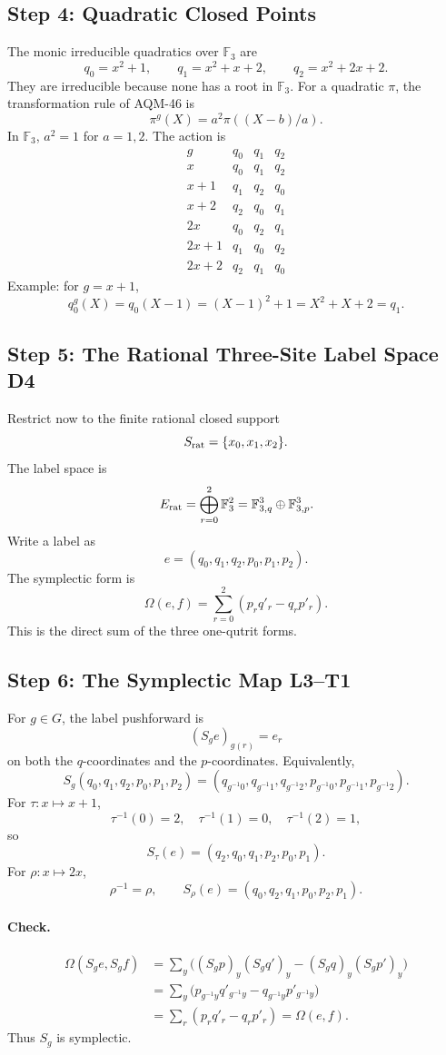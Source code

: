 \subsection{Step 4: Quadratic Closed Points}
The monic irreducible quadratics over \(\mathbb F_3\) are
\[
  q_0=x^2+1,\qquad q_1=x^2+x+2,\qquad q_2=x^2+2x+2.
\]
They are irreducible because none has a root in \(\mathbb F_3\).  For a
quadratic \(\pi\), the transformation rule of AQM-46 is
\[
  \pi^g(X)=a^2\pi((X-b)/a).
\]
In \(\mathbb F_3\), \(a^2=1\) for \(a=1,2\).  The action is
\[
\begin{array}{c|ccc}
g&q_0&q_1&q_2\\
\hline
x&q_0&q_1&q_2\\
x+1&q_1&q_2&q_0\\
x+2&q_2&q_0&q_1\\
2x&q_0&q_2&q_1\\
2x+1&q_1&q_0&q_2\\
2x+2&q_2&q_1&q_0
\end{array}
\]
Example: for \(g=x+1\),
\[
  q_0^g(X)=q_0(X-1)=(X-1)^2+1=X^2+X+2=q_1.
\]
\subsection{Step 5: The Rational Three-Site Label Space D4}
Restrict now to the finite rational closed support
\[
  S_{\rm rat}=\{x_0,x_1,x_2\}.
\]
The label space is
\[
  E_{\rm rat}
  =
  \bigoplus_{r=0}^2\mathbb F_3^2
  =
  \mathbb F_{3,q}^3\oplus\mathbb F_{3,p}^3.
\]
Write a label as
\[
  e=(q_0,q_1,q_2,p_0,p_1,p_2).
\]
The symplectic form is
\[
  \Omega(e,f)=
  \sum_{r=0}^2(p_rq'_r-q_rp'_r).
\]
This is the direct sum of the three one-qutrit forms.
\subsection{Step 6: The Symplectic Map L3--T1}
For \(g\in G\), the label pushforward is
\[
  (S_ge)_{g(r)}=e_r
\]
on both the \(q\)-coordinates and the \(p\)-coordinates.  Equivalently,
\[
  S_g(q_0,q_1,q_2,p_0,p_1,p_2)
  =
  (q_{g^{-1}0},q_{g^{-1}1},q_{g^{-1}2},
   p_{g^{-1}0},p_{g^{-1}1},p_{g^{-1}2}).
\]
For \(\tau:x\mapsto x+1\),
\[
  \tau^{-1}(0)=2,\quad \tau^{-1}(1)=0,\quad \tau^{-1}(2)=1,
\]
so
\[
  S_\tau(e)=(q_2,q_0,q_1,p_2,p_0,p_1).
\]
For \(\rho:x\mapsto2x\),
\[
  \rho^{-1}=\rho,
  \qquad
  S_\rho(e)=(q_0,q_2,q_1,p_0,p_2,p_1).
\]

\paragraph{Check.}
\[
\begin{aligned}
  \Omega(S_ge,S_gf)
  &=
  \sum_y\bigl((S_gp)_y(S_gq')_y-(S_gq)_y(S_gp')_y\bigr)\\
  &=
  \sum_y\bigl(p_{g^{-1}y}q'_{g^{-1}y}
       -q_{g^{-1}y}p'_{g^{-1}y}\bigr)\\
  &=
  \sum_r(p_rq'_r-q_rp'_r)
  =
  \Omega(e,f).
\end{aligned}
\]
Thus \(S_g\) is symplectic.
